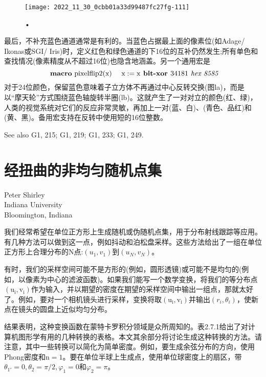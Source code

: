 \begin{CJK}{UTF8}{gbsn}
\begin{figure}[htbp]
\texttt{[image: 2022\_11\_30\_0cbb01a33d99487fc27fg-111]}
\caption{•}
\end{figure}

最后，不补充蓝色通道通常是有利的。当蓝色占据最上面的像素位(如Adage/ Ikonas或SGI/ Iris)时，定义红色和绿色通道的下16位的互补仍然发生;所有单色和查找情况(像素精度从不超过16位)也隐含地涵盖。另一个通用宏是
$$
\text { \textbf{macro} pixelflip2(x) } \quad \mathrm{x}:=\mathrm{x} \textbf { bit-xor } 34181 \textit { hex  8585}
$$
对于24位颜色，保留蓝色意味着子立方体不再通过中心反转交换(图la)，而是以“摩天轮”方式围绕蓝色轴旋转半圈(lb)。这就产生了一对对立的颜色(红、绿)，人类的视觉系统对它们的反应非常灵敏，再加上一对(蓝、白)、(青色、品红)和(黄、黑)。备用宏支持在反转中使用短的16位整数。

See also G1, 215; G1, 219; G1, 233; G1, 249.

\newpage
\section{经扭曲的非均匀随机点集}
\begin{center}
\small{
Peter Shirley\\
Indiana University\\
Bloomington, Indiana}
\end{center}

我们经常希望在单位正方形上生成随机或伪随机点集，用于分布射线跟踪等应用。有几种方法可以做到这一点，例如抖动和泊松盘采样。这些方法给出了一组在单位正方形上合理分布的$\mathrm{N}$点:$\left(u_{1}, v_{1}\right)$到$\left(u_{N}, v_{N}\right)$。

有时，我们的采样空间可能不是方形的(例如，圆形透镜)或可能不是均匀的(例如，以像素为中心的滤波函数)。如果我们能写一个数学变换，将我们的等分布点$\left(\mathrm{u}_{\mathrm{i}}, \mathrm{v}_{\mathrm{i}}\right)$作为输入，并以期望的密度在期望的采样空间中输出一组点，那就太好了。例如，要对一个相机镜头进行采样，变换将取$\left(\mathrm{u}_{\mathrm{i}}, \mathrm{v}_{\mathrm{i}}\right)$并输出$\left(r_{i}, \theta_{i}\right)$，使新点在镜头的圆盘上近似均匀分布。

结果表明，这种变换函数在蒙特卡罗积分领域是众所周知的。表2.7.1给出了对计算机图形学有用的几种转换的表格。本文其余部分将讨论生成这种转换的方法。请注意，其中一些转换可以简化为简单密度。例如，要生成余弦分布的方向，使用Phong密度和$\mathrm{n}=1$。要在单位半球上生成点，使用单位球密度上的扇区，带$\theta_{1'}=0, \theta_{2}=\pi / 2, \varphi_{1}=0$和$\varphi_{2}=\pi$。


\end{CJK}
